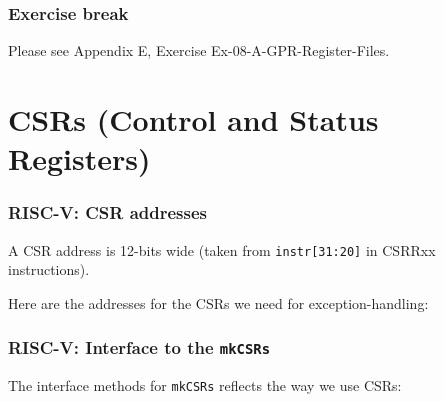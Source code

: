 
\begin{frame}
\frametitle{\EmojiExercise \hmm Exercise break}

Please see Appendix E, Exercise Ex-08-A-GPR-Register-Files.

\end{frame}


\section{CSRs (Control and Status Registers)}


\begin{frame}[fragile]
\frametitle{RISC-V: CSR addresses}

\footnotesize

A CSR address is 12-bits wide (taken from {\tt instr[31:20]} in CSRRxx instructions).

\vspace{2ex}

Here are the addresses for the CSRs we need for exception-handling:

\vspace{2ex}


\end{frame}


\begin{frame}[fragile]
\frametitle{RISC-V: Interface to the {\tt mkCSRs}}

\footnotesize

The interface methods for {\tt mkCSRs} reflects the way we use CSRs:

\vspace{1ex}


\end{frame}


